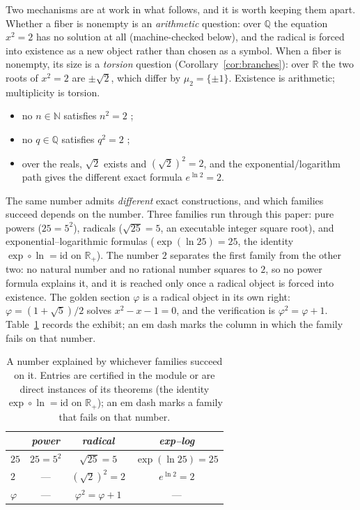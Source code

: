 \documentclass[submission,noinfoline]{jsfds}
\newcommand{\Lean}[1]{}
\begin{document}
Two mechanisms are at work in what follows, and it is worth keeping
them apart. Whether a fiber is nonempty is an \emph{arithmetic}
question: over $\mathbb Q$ the equation $x^2=2$ has no solution at all
(machine-checked below), and the radical is forced into existence as a
new object rather than chosen as a symbol. When a fiber is nonempty,
its size is a \emph{torsion} question
(Corollary~\ref{cor:branches}): over $\mathbb R$ the two roots of
$x^2=2$ are $\pm\sqrt2$, which differ by $\mu_2=\{\pm1\}$. Existence is
arithmetic; multiplicity is torsion.
\begin{itemize}
\item no $n\in\mathbb N$ satisfies $n^2=2$ \Lean{two\_not\_sq\_nat};
\item no $q\in\mathbb Q$ satisfies $q^2=2$ \Lean{two\_not\_sq\_rat};
\item over the reals, $\sqrt 2$ exists and $(\sqrt2)^2=2$, and the
exponential/logarithm path gives the different exact formula
$e^{\ln 2}=2$.
\end{itemize}
The same number admits \emph{different} exact constructions, and which
families succeed depends on the number. Three families run through this
paper: pure powers ($25=5^2$), radicals ($\sqrt{25}=5$, an executable
integer square root), and exponential--logarithmic formulas
($\exp(\ln 25)=25$, the identity $\exp\circ\ln=\mathrm{id}$ on
$\mathbb R_+$). The number $2$ separates the first family from the other
two: no natural number and no rational number squares to $2$, so no
power formula explains it, and it is reached only once a radical object
is forced into existence. The golden section $\varphi$ is a radical
object in its own right: $\varphi=(1+\sqrt5)/2$ solves $x^2-x-1=0$, and
the verification is $\varphi^2=\varphi+1$.
Table~\ref{tab:exhibit} records the exhibit; an em dash marks the column
in which the family fails on that number.

\begin{table}[ht]
\centering
\begin{tabular}{lccc}
  & \emph{power} & \emph{radical} & \emph{exp--log}\\
  \hline
  $25$ & $25=5^2$ & $\sqrt{25}=5$ & $\exp(\ln 25)=25$\\
  $2$ & --- & $(\sqrt2)^2=2$ & $e^{\ln 2}=2$\\
  $\varphi$ & --- & $\varphi^2=\varphi+1$ & ---\\
  \hline
\end{tabular}
\caption{A number explained by whichever families succeed on it.
Entries are certified in the module or are direct instances of its
theorems (the identity $\exp\circ\ln=\mathrm{id}$ on $\mathbb R_+$); an
em dash marks a family that fails on that number.}
\label{tab:exhibit}
\end{table}
\end{document}
